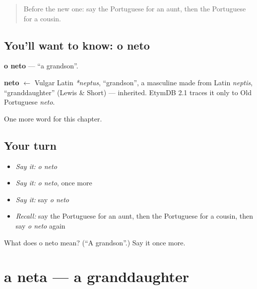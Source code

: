 \label{lesson:PT-C38-neto}



\begin{quote}
Before the new one: say the Portuguese for an aunt, then the Portuguese for a cousin.
\end{quote}

\subsection*{You'll want to know: o neto}
\textbf{o neto} — \textquotedblleft{}a grandson\textquotedblright{}.

\begin{cousinweb}
\textbf{neto} $\leftarrow$ Vulgar Latin \emph{*neptus}, \textquotedblleft{}grandson\textquotedblright{}, a masculine made from Latin \emph{neptis}, \textquotedblleft{}granddaughter\textquotedblright{} (Lewis \& Short) — inherited. EtymDB 2.1 traces it only to Old Portuguese \emph{neto}.
\end{cousinweb}

\begin{grammarlens}[title={What you've built}]
One more word for this chapter.
\end{grammarlens}

\subsection*{Your turn}
\begin{itemize}
\raggedright
  \item \emph{Say it:} \emph{o neto}
  \item \emph{Say it:} \emph{o neto}, once more
  \item \emph{Say it:} say \emph{o neto}
  \item \emph{Recall:} say the Portuguese for an aunt, then the Portuguese for a cousin, then say \emph{o neto} again
\end{itemize}

\begin{tcolorbox}[breakable,colback=teal!4,colframe=teal!35!black,title={Before you move on}]
What does o neto mean? (\textquotedblleft{}A grandson\textquotedblright{}.) Say it once more.
\end{tcolorbox}
\section[a neta]{a neta — a granddaughter}

\label{lesson:PT-C38-neta}



